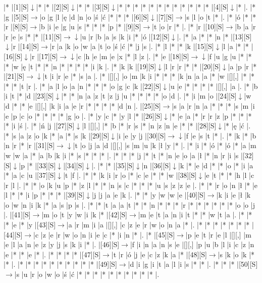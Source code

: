 \documentclass[11pt]{article}
\newcommand\drarr{$\rightarrow \!\!\!\!\! \downarrow$}
\newcommand\rarr{$\rightarrow$}
\newcommand\darr{$\downarrow$}
\begin{document}
\noindent\begin{Puzzle}{21}{32}|*	|[1][S]\darr	|*	|*	|[2][S]\darr	|*	|*	|[3][S]\darr	|*	|*	|*	|*	|*	|*	|*	|*	|*	|*	|*	|*	|[4][S]\darr	|*	|.
|*	|g	|[5][S]\rarr	|o	|g	|l	|ę	|d	|n	|o	|ś	|ć	|*	|*	|*	|[6][S]\darr	|[7][S]\rarr	|s	|l	|o	|t	|*	|.
|*	|ó	|*	|*	|r	|[8][S]\rarr	|b	|i	|e	|g	|u	|s	|*	|*	|*	|p	|*	|[9][S]\rarr	|t	|o	|r	|*	|.
|*	|r	|[10][S]\rarr	|b	|a	|r	|r	|e	|s	|*	|*	|[11][S]\drarr	|u	|r	|b	|a	|s	|k	|i	|*	|ó	|[12][S]\darr	|.
|*	|a	|*	|*	|n	|*	|[13][S]\darr	|r	|[14][S]\rarr	|r	|a	|k	|o	|w	|a	|t	|o	|ś	|ć	|*	|j	|s	|.
|*	|l	|*	|*	|k	|[15][S]\darr	|l	|a	|*	|*	|[16][S]\darr	|r	|[17][S]\drarr	|c	|h	|e	|m	|e	|x	|*	|l	|z	|.
|*	|e	|[18][S]\drarr	|f	|u	|g	|u	|*	|*	|*	|w	|ę	|t	|*	|*	|n	|*	|*	|*	|*	|i	|k	|.
|*	|k	|k	|[19][S]\darr	|l	|r	|r	|*	|*	|[20][S]\darr	|a	|p	|r	|*	|[21][S]\drarr	|t	|i	|r	|e	|*	|s	|a	|.
|*	|[][,]{ }	|o	|m	|k	|i	|*	|*	|*	|k	|n	|a	|a	|*	|w	|[][,]{ }	|*	|*	|*	|*	|t	|r	|.
|*	|a	|l	|o	|a	|n	|*	|*	|*	|o	|g	|c	|k	|[22][S]\darr	|u	|e	|*	|*	|*	|*	|[][,]{ }	|a	|.
|*	|b	|i	|t	|*	|d	|[23][S]\darr	|*	|*	|n	|a	|z	|t	|z	|j	|u	|*	|*	|*	|*	|o	|d	|.
|*	|i	|m	|o	|[24][S]\darr	|w	|d	|*	|*	|e	|[][,]{ }	|k	|i	|a	|e	|r	|*	|*	|*	|*	|d	|n	|.
|[25][S]\rarr	|s	|a	|r	|n	|a	|*	|*	|*	|s	|m	|i	|e	|p	|c	|o	|*	|*	|*	|*	|g	|o	|.
|*	|y	|c	|*	|y	|l	|*	|[26][S]\darr	|*	|e	|a	|*	|r	|r	|z	|p	|*	|*	|*	|*	|i	|ś	|.
|*	|ń	|j	|[27][S]\darr	|l	|[][,]{ }	|*	|b	|*	|r	|s	|*	|n	|z	|n	|e	|*	|*	|[28][S]\darr	|*	|ę	|ć	|.
|*	|s	|a	|z	|o	|k	|*	|a	|*	|s	|k	|[29][S]\darr	|i	|e	|y	|j	|[30][S]\drarr	|f	|e	|s	|t	|*	|.
|*	|k	|*	|b	|n	|r	|*	|r	|[31][S]\drarr	|t	|o	|j	|a	|d	|[][,]{ }	|s	|m	|u	|k	|ł	|y	|*	|.
|*	|i	|*	|ó	|*	|ó	|*	|a	|m	|w	|w	|a	|*	|a	|b	|k	|i	|*	|s	|*	|*	|*	|.
|*	|*	|*	|j	|*	|t	|*	|n	|e	|o	|a	|ł	|*	|n	|r	|i	|s	|[32][S]\darr	|p	|*	|[33][S]\darr	|[34][S]\darr	|.
|*	|*	|[35][S]\darr	|n	|[36][S]\darr	|k	|*	|e	|d	|*	|*	|o	|*	|i	|a	|*	|a	|c	|u	|[37][S]\darr	|t	|f	|.
|*	|*	|k	|i	|r	|o	|*	|c	|e	|*	|*	|w	|[38][S]\darr	|e	|t	|*	|*	|h	|l	|c	|r	|l	|.
|*	|*	|o	|k	|u	|p	|*	|z	|l	|*	|*	|n	|s	|c	|*	|*	|*	|u	|s	|z	|z	|e	|.
|*	|*	|r	|o	|n	|ł	|*	|e	|l	|*	|*	|i	|p	|*	|*	|*	|[39][S]\darr	|j	|j	|a	|e	|k	|.
|*	|*	|y	|w	|w	|e	|[40][S]\rarr	|k	|i	|e	|ł	|k	|o	|w	|n	|i	|k	|*	|a	|s	|p	|s	|.
|*	|*	|t	|a	|a	|t	|*	|*	|n	|*	|*	|*	|r	|*	|*	|*	|*	|*	|*	|o	|o	|j	|.
|[41][S]\rarr	|m	|o	|t	|y	|w	|i	|k	|*	|[42][S]\rarr	|m	|e	|t	|a	|n	|i	|t	|*	|*	|w	|t	|a	|.
|*	|*	|*	|e	|*	|y	|[43][S]\rarr	|a	|r	|m	|i	|a	|[][,]{ }	|c	|z	|e	|r	|w	|o	|n	|a	|*	|.
|*	|*	|*	|*	|*	|*	|*	|[44][S]\rarr	|c	|z	|e	|r	|w	|o	|n	|i	|e	|c	|*	|i	|n	|*	|.
|*	|[45][S]\rarr	|p	|e	|t	|r	|e	|l	|[][,]{ }	|m	|e	|l	|a	|n	|e	|z	|y	|j	|s	|k	|i	|*	|.
|[46][S]\rarr	|f	|i	|n	|a	|n	|s	|e	|[][,]{ }	|p	|u	|b	|l	|i	|c	|z	|n	|e	|*	|*	|e	|*	|.
|*	|*	|*	|*	|[47][S]\rarr	|t	|r	|ó	|j	|e	|c	|z	|k	|a	|*	|[48][S]\rarr	|s	|k	|o	|k	|*	|*	|.
|*	|*	|*	|*	|*	|*	|*	|*	|*	|*	|[49][S]\rarr	|d	|i	|g	|i	|t	|a	|l	|i	|s	|*	|*	|.
|*	|*	|*	|[50][S]\rarr	|s	|u	|r	|o	|w	|o	|ś	|ć	|*	|*	|*	|*	|*	|*	|*	|*	|*	|*	|.\end{Puzzle}
\end{document}
